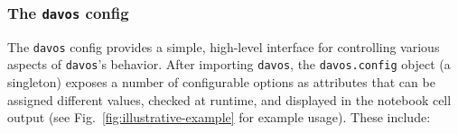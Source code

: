 \documentclass[preprint,12pt,a4paper]{elsarticle}
\begin{document}
\subsubsection{The \texttt{davos} config}\label{subsec:config}
The \texttt{davos} config provides a simple, high-level interface for controlling various aspects of \texttt{davos}'s behavior. After importing \texttt{davos}, the \texttt{davos.config} object (a singleton) exposes a number of configurable options as attributes that can be assigned different values, checked at runtime, and displayed in the notebook cell output (see Fig.~\ref{fig:illustrative-example} for example usage). These include:
\end{document}
